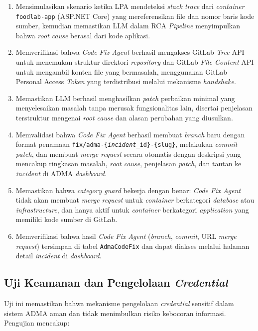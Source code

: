 \begin{enumerate}[label=\arabic*., leftmargin=*]
  \item Mensimulasikan skenario ketika LPA mendeteksi \textit{stack trace} dari \textit{container} \texttt{foodlab-app} (ASP.NET Core) yang mereferensikan file dan nomor baris kode sumber, kemudian memastikan LLM dalam RCA \textit{Pipeline} menyimpulkan bahwa \textit{root cause} berasal dari kode aplikasi.
  \item Memverifikasi bahwa \textit{Code Fix Agent} berhasil mengakses GitLab \textit{Tree} API untuk menemukan struktur direktori \textit{repository} dan GitLab \textit{File Content} API untuk mengambil konten file yang bermasalah, menggunakan GitLab Personal Access \textit{Token} yang terdistribusi melalui mekanisme \textit{handshake}.
  \item Memastikan LLM berhasil menghasilkan \textit{patch} perbaikan minimal yang menyelesaikan masalah tanpa merusak fungsionalitas lain, disertai penjelasan terstruktur mengenai \textit{root cause} dan alasan perubahan yang diusulkan.
  \item Memvalidasi bahwa \textit{Code Fix Agent} berhasil membuat \textit{branch} baru dengan format penamaan \texttt{fix/adma-\{\textit{incident}\_id\}-\{slug\}}, melakukan \textit{commit} \textit{patch}, dan membuat \textit{merge request} secara otomatis dengan deskripsi yang mencakup ringkasan masalah, \textit{root cause}, penjelasan \textit{patch}, dan tautan ke \textit{incident} di ADMA \textit{dashboard}.
  \item Memastikan bahwa \textit{category guard} bekerja dengan benar: \textit{Code Fix Agent} tidak akan membuat \textit{merge request} untuk \textit{container} berkategori \textit{database} atau \textit{infrastructure}, dan hanya aktif untuk \textit{container} berkategori \textit{application} yang memiliki kode sumber di GitLab.
  \item Memverifikasi bahwa hasil \textit{Code Fix Agent} (\textit{branch}, \textit{commit}, URL \textit{merge request}) tersimpan di tabel \texttt{AdmaCodeFix} dan dapat diakses melalui halaman detail \textit{incident} di \textit{dashboard}.
\end{enumerate}

\subsection{Uji Keamanan dan Pengelolaan \textit{Credential}}

Uji ini memastikan bahwa mekanisme pengelolaan \textit{credential} sensitif dalam sistem ADMA aman dan tidak menimbulkan risiko kebocoran informasi. Pengujian mencakup:

